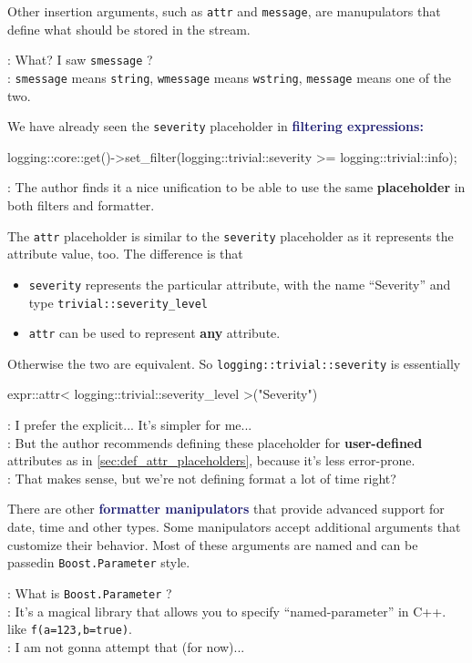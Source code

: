 \documentclass[dvipsnames]{article}
\newcommand{\mycola}{MidnightBlue}
\newcommand{\Cola}[1]{\textcolor{\mycola}{\textbf{#1}}}
\begin{document}
Other insertion arguments, such as \texttt{attr} and
\texttt{message}, are manupulators that define what should be stored in the
stream.

\begin{tcolorbox}
   : What? I saw \texttt{smessage} ?\\
   : \texttt{smessage} means \texttt{string}, \texttt{wmessage}
  means \texttt{wstring}, \texttt{message} means one of the two.
\end{tcolorbox}

We have already seen the \texttt{severity} placeholder in \Cola{filtering expressions:}
\begin{simplec}
  logging::core::get()->set_filter(logging::trivial::severity >= logging::trivial::info);
\end{simplec}
\begin{tcolorbox}
   : The author finds it a nice unification to be able to use the
  same \textbf{placeholder} in both filters and formatter.
\end{tcolorbox}

The \texttt{attr} placeholder is similar to the \texttt{severity} placeholder as
it represents the attribute value, too. The difference is that
\begin{itemize}
\item \texttt{severity} represents the particular attribute,
  with the name ``Severity'' and type \texttt{trivial::severity\_level}
\item \texttt{attr} can be used to represent \textbf{any} attribute.
\end{itemize}
Otherwise the two are equivalent. So \texttt{logging::trivial::severity} is
essentially
\begin{simplec}
  expr::attr< logging::trivial::severity_level >("Severity")
\end{simplec}

\begin{tcolorbox}
   : I prefer the explicit... It's simpler for me...\\
   : But the author recommends defining these placeholder for
  \textbf{user-defined} attributes as in \cref{sec:def_attr_placeholders},
  because it's less error-prone.\\
   : That makes sense, but we're not defining format a lot of
  time right?
\end{tcolorbox}

There are other \Cola{formatter manipulators} that provide advanced support for
date, time and other types. Some manipulators accept additional arguments that
customize their behavior. Most of these arguments are named and can be passedin
\texttt{Boost.Parameter} style.

\begin{tcolorbox}
   : What is \texttt{Boost.Parameter} ?\\
   : It's a magical library that allows you to specify
  ``named-parameter'' in C++. like \texttt{f(a=123,b=true)}.\\
   : I am not gonna attempt that (for now)...
\end{tcolorbox}
\end{document}
